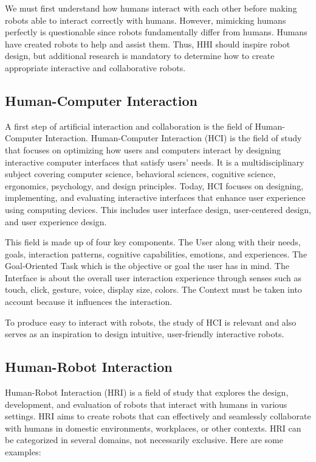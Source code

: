 We must first understand how humans interact with each other before making robots able to interact correctly with humans. However, mimicking humans perfectly is questionable since robots fundamentally differ from humans. Humans have created robots to help and assist them. Thus, HHI should inspire robot design, but additional research is mandatory to determine how to create appropriate interactive and collaborative robots.

\subsection{Human-Computer Interaction}

A first step of artificial interaction and collaboration is the field of Human-Computer Interaction. Human-Computer Interaction (HCI) is the field of study that focuses on optimizing how users and computers interact by designing interactive computer interfaces that satisfy users' needs. It is a multidisciplinary subject covering computer science, behavioral sciences, cognitive science, ergonomics, psychology, and design principles.
Today, HCI focuses on designing, implementing, and evaluating interactive interfaces that enhance user experience using computing devices. This includes user interface design, user-centered design, and user experience design. 

This field is made up of four key components. 
The User along with their needs, goals, interaction patterns, cognitive capabilities, emotions, and experiences.
The Goal-Oriented Task which is the objective or goal the user has in mind.
The Interface is about the overall user interaction experience through senses such as touch, click, gesture, voice, display size, colors.
The Context must be taken into account because it influences the interaction. 

To produce easy to interact with robots, the study of HCI is relevant and also serves as an inspiration to design intuitive, user-friendly interactive robots.

\subsection{Human-Robot Interaction}

Human-Robot Interaction (HRI) is a field of study that explores the design, development, and evaluation of robots that interact with humans in various settings. HRI aims to create robots that can effectively and seamlessly collaborate with humans in domestic environments, workplaces, or other contexts. 
HRI can be categorized in several domains, not necessarily exclusive. Here are some examples:

